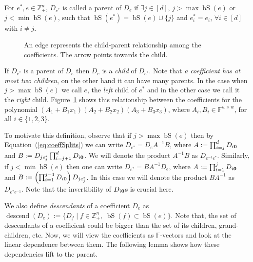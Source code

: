 \documentclass[final,oneeqnum, onethmnum, onefignum]{siamltex1213}
\newcommand{\Zp}{\mathbb{Z}_+}
\newcommand{\F}{\mathbb F}
\newcommand{\inputfig}[1]{%
}
\DeclareMathOperator{\bS}{bS}
\DeclareMathOperator{\descend}{descend}
\begin{document}
\begin{definition}
For $e^*,e \in \Zp^n$, $D_{e^*}$ is called a parent of $D_{e}$
if 
$\exists j \in [d]$,  
$j > \max \bS(e)$ or $j < \min  \bS(e) $,
such that
$\bS(e^*) = \bS(e) \cup \{j\}$
and $e^*_i = e_i$, $\forall i \in [d]$ with $i \neq j$.
\end{definition}

\begin{figure}
\centering
\inputfig{tree}
\caption{An edge represents the child-parent relationship among the coefficients.
The arrow points towards the child.}
\label{fig:tree}
\end{figure}

If $D_{e^*}$ is a parent of $D_{e}$ then 
$D_{e}$ is a {\em child} of $D_{e^*}$.
Note that {\em a coefficient has at most two children},
on the other hand it can have many parents.
In the case when $j > \max \bS(e)$
 we call $e$, the {\em left} child of $e^*$ and 
in the other case we call it the {\em right} child.
Figure~\ref{fig:tree} shows this relationship between the coefficients 
for the polynomial $(A_1 + B_1 x_1)(A_2 + B_2 x_2)(A_3 + B_3 x_3)$,
where $A_i,B_i \in \F^{w \times w}$, for all $i \in \{1,2,3\}$.

To motivate this definition, 
observe that if $j > \max  \bS(e)$ then by Equation~(\ref{eq:coeffSplits}) 
we can write
$D_{e^*} = D_e A^{-1} B$, where $A := \prod_{i=j}^{d} D_{i{\bf 0}}$
and $B := D_{j e^*_{j}}\prod_{i=j+1}^{d} D_{i{\bf 0}}$.
We will denote the product $A^{-1}B$ as $D_{e^{-1}e^*}$.
Similarly, if $j < \min \bS(e)$ then one can write
$D_{e^*} = B A^{-1} D_e $, where $A := \prod_{i=1}^{j} D_{i{\bf 0}}$
and $B := \left(\prod_{i=1}^{j-1} D_{i{\bf 0}} \right) D_{j e^*_{j}}$.
In this case we will denote the product $B A^{-1}$ as $D_{e^*e^{-1}}$.
Note that the invertibility of $D_{i {\bf 0}}$s is crucial here. 

We also define {\em descendants} of a coefficient $D_e$
as $\descend(D_e) := \{D_f \mid f \in \Zp^n, \; \bS(f) \subset \bS(e) \}$.
Note that, the set of descendants of a coefficient 
could be bigger than the set of its children, grand-children, etc.
Now, we will view the coefficients as $\F$-vectors 
and look at the linear dependence between them. 
The following lemma shows how these dependencies lift to the parent. 
\end{document}
